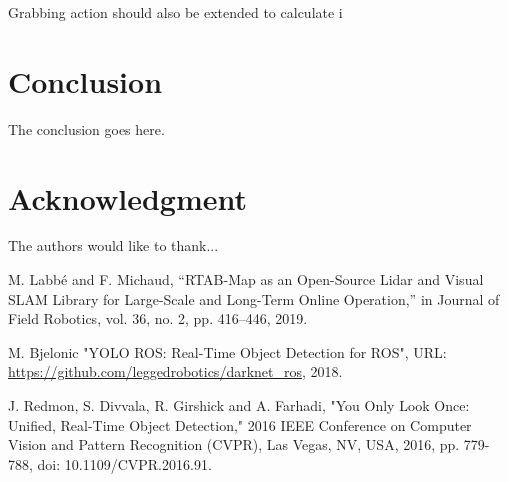 \documentclass[conference,a4paper]{IEEEtran}
\begin{document}
Grabbing action should also be extended to calculate i

\section{Conclusion}
The conclusion goes here.

\section*{Acknowledgment}


The authors would like to thank...





%
%
%
\begin{thebibliography}{1}

M. Labbé and F. Michaud, “RTAB-Map as an Open-Source Lidar and Visual SLAM Library for Large-Scale and Long-Term Online Operation,” in Journal of Field Robotics, vol. 36, no. 2, pp. 416–446, 2019. 

M. Bjelonic "YOLO ROS: Real-Time Object Detection for ROS", URL: \url{https://github.com/leggedrobotics/darknet_ros}, 2018.

J. Redmon, S. Divvala, R. Girshick and A. Farhadi, "You Only Look Once: Unified, Real-Time Object Detection," 2016 IEEE Conference on Computer Vision and Pattern Recognition (CVPR), Las Vegas, NV, USA, 2016, pp. 779-788, doi: 10.1109/CVPR.2016.91.

\end{thebibliography}




\end{document}
